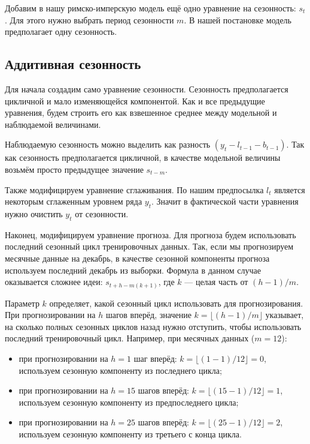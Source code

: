 \documentclass[12pt,fleqn]{article}
\begin{document}
Добавим в нашу римско-имперскую модель ещё одно уравнение на сезонность: $s_t$.
Для этого нужно выбрать период сезонности $m$.
В нашей постановке модель предполагает одну сезонность.

\subsection{Аддитивная сезонность}

Для начала создадим само уравнение сезонности.
Сезонность предполагается цикличной и мало изменяющейся компонентой.
Как и все предыдущие уравнения, будем строить его как взвешенное среднее между модельной и наблюдаемой величинами.

Наблюдаемую сезонность можно выделить как разность $(y_t - l_{t-1} - b_{t-1})$.
Так как сезонность предполагается цикличной, в качестве модельной величины возьмём просто предыдущее значение $s_{t-m}$.

Также модифицируем уравнение сглаживания.
По нашим предпосылка $l_t$ является некоторым сглаженным уровнем ряда $y_t$.
Значит в фактической части уравнения нужно очистить $y_t$ от сезонности.

Наконец, модифицируем уравнение прогноза.
Для прогноза будем использовать последний сезонный цикл тренировочных данных.
Так, если мы прогнозируем месячные данные на декабрь, в качестве сезонной компоненты прогноза используем последний декабрь из выборки.
Формула в данном случае оказывается сложнее идеи: $s_{t+h-m(k+1)}$, где $k$ — целая часть от $(h-1)/m$.

Параметр $k$ определяет, какой сезонный цикл использовать для прогнозирования.
При прогнозировании на $h$ шагов вперёд, значение $k = \lfloor(h-1)/m\rfloor$ указывает, на сколько полных сезонных циклов назад нужно отступить, чтобы использовать последний тренировочный цикл.
Например, при месячных данных ($m=12$):

\begin{itemize}
  \item при прогнозировании на $h=1$ шаг вперёд: $k = \lfloor(1-1)/12\rfloor = 0$, используем сезонную компоненту из последнего цикла;
  \item при прогнозировании на $h=15$ шагов вперёд: $k = \lfloor(15-1)/12\rfloor = 1$, используем сезонную компоненту из предпоследнего цикла;
  \item при прогнозировании на $h=25$ шагов вперёд: $k = \lfloor(25-1)/12\rfloor = 2$, используем сезонную компоненту из третьего с конца цикла.
\end{itemize}
\end{document}
